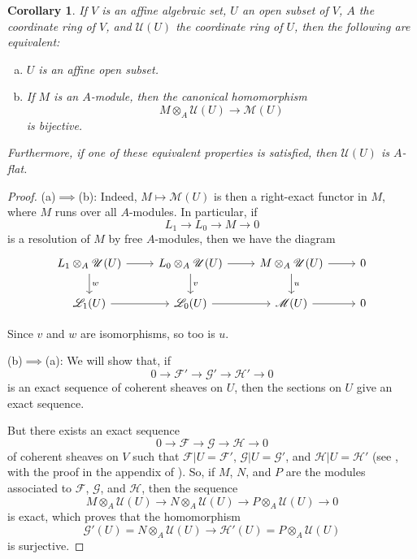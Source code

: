 \documentclass{article}
\theoremstyle{plain}
\newtheorem*{corollary}{Corollary}
\newcommand{\scr}[1]{{\mathscr{#1}}}
\newcommand{\oldpage}[1]{\marginpar{\footnotesize$\Big\vert$ \textit{p.~#1}}}
\begin{document}
\begin{corollary}
  If $V$ is an affine algebraic set, $U$ an open subset of $V$, $A$ the coordinate ring of $V$, and $\scr{U}(U)$ the coordinate ring of $U$, then the following are equivalent:
  \begin{enumerate}[(a)]
    \item $U$ is an affine open subset.
    \item If $M$ is an $A$-module, then the canonical homomorphism
      \[
        M\otimes_A\scr{U}(U) \to \scr{M}(U)
      \]
      is bijective.
  \end{enumerate}

\oldpage{2-08}
  Furthermore, if one of these equivalent properties is satisfied, then $\scr{U}(U)$ is $A$-flat.
\end{corollary}

\begin{proof}
  (a)$\implies$(b):
  Indeed, $M\mapsto\scr{M}(U)$ is then a right-exact functor in $M$, where $M$ runs over all $A$-modules.
  In particular, if
  \[
    L_1 \to L_0 \to M \to 0
  \]
  is a resolution of $M$ by free $A$-modules, then we have the diagram
  \[
    \begin{tikzcd}
      L_1\otimes_A\scr{U}(U) \rar \dar["w"]
      & L_0\otimes_A\scr{U}(U) \rar \dar["v"]
      & M\otimes_A\scr{U}(U) \rar \dar["u"]
      & 0
    \\\scr{L}_1(U) \rar
      & \scr{L}_0(U) \rar
      & \scr{M}(U) \rar
      & 0
    \end{tikzcd}
  \]

  Since $v$ and $w$ are isomorphisms, so too is $u$.

  \bigskip
  (b)$\implies$(a):
  We will show that, if
  \[
    0 \to \scr{F}' \to\scr{G}' \to \scr{H}' \to 0
  \]
  is an exact sequence of coherent sheaves on $U$, then the sections on $U$ give an exact sequence.

  But there exists an exact sequence
  \[
    0 \to \scr{F} \to \scr{G} \to \scr{H} \to 0
  \]
  of coherent sheaves on $V$ such that $\scr{F}|U=\scr{F}'$, $\scr{G}|U=\scr{G}'$, and $\scr{H}|U=\scr{H}'$ (see \cite{1}, with the proof in the appendix of \cite{2}).
  So, if $M$, $N$, and $P$ are the modules associated to $\scr{F}$, $\scr{G}$, and $\scr{H}$, then the sequence
  \[
    M\otimes_A\scr{U}(U) \to N\otimes_A\scr{U}(U) \to P\otimes_A\scr{U}(U) \to 0
  \]
  is exact, which proves that the homomorphism
  \[
    \scr{G}'(U) = N\otimes_A\scr{U}(U) \to \scr{H}'(U) = P\otimes_A\scr{U}(U)
  \]
  is surjective.
\end{proof}
\end{document}

